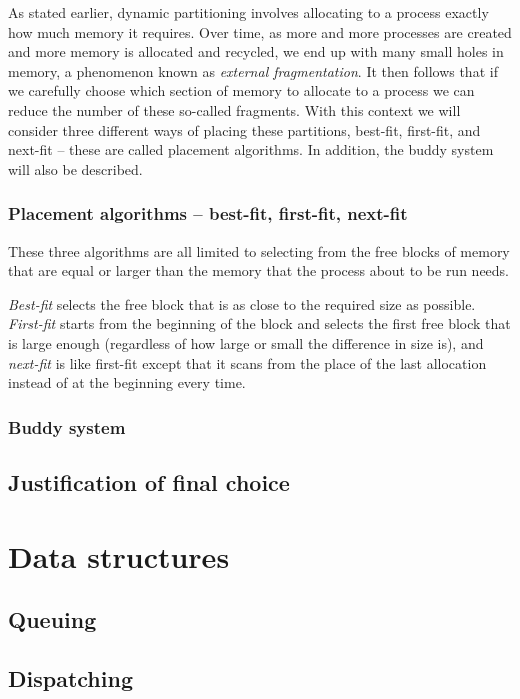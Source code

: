 \documentclass[12pt]{article}
\begin{document}
As stated earlier, dynamic partitioning involves allocating to a process
exactly how much memory it requires. Over time, as more and more processes
are created and more memory is allocated and recycled, we end up with many
small holes in memory, a phenomenon known as \textit{external fragmentation}.
It then follows that if we carefully choose which section of memory to allocate
to a process we can reduce the number of these so-called fragments. With this
context we will consider three different ways of placing these partitions,
best-fit, first-fit, and next-fit -- these are called placement algorithms.
In addition, the buddy system will also be described.

\subsubsection{Placement algorithms -- best-fit, first-fit, next-fit}
These three algorithms are all limited to selecting from the free blocks of
memory that are equal or larger than the memory that the process about to be
run needs.

\textit{Best-fit} selects the free block that is as close to the required size
as possible. \textit{First-fit} starts from the beginning of the block and
selects the first free block that is large enough (regardless of how large or
small the difference in size is), and \textit{next-fit} is like first-fit
except that it scans from the place of the last allocation instead of at the
beginning every time.

\subsubsection{Buddy system}


\subsection{Justification of final choice}

\section{Data structures}

\subsection{Queuing}

\subsection{Dispatching}
\end{document}
